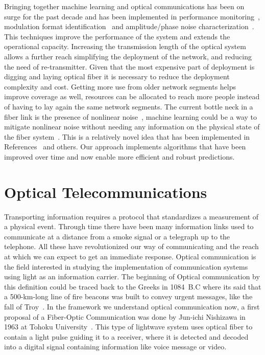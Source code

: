 Bringing together machine learning and optical communications has been on surge for the past decade and has been implemented in performance monitoring~\cite{shen2010optical,jargon2008optical}, modulation format identification~\cite{khan2012modulation} and amplitude/phase noise characterization~\cite{zibar2015application}. This techniques improve the performance of the system and extends the operational capacity. Increasing the transmission length of the optical system allows a further reach simplifying the deployment of the network, and reducing the need of re-transmitter. Given that the most expensive part of deployment is digging and laying optical fiber it is necessary to reduce the deployment complexity and cost. Getting more use from older network segments helps improve coverage as well, resources can be allocated to reach more people instead of having to lay again the same network segments. The current bottle neck in a fiber link is the presence of nonlinear noise~\cite{NLPNDSP}, machine learning could be a way to mitigate nonlinear noise without needing any information on the physical state of the fiber system~\cite{Nonparameter}. This is a relatively novel idea that has been implemented in References~\cite{Nonparameter,zibar2015application} and others. Our approach implements algorithms that have been improved over time and now enable more efficient and robust predictions.  






 



\section{Optical Telecommunications}

Transporting information requires a protocol that standardizes a measurement of a physical event. Through time there have been many information links used to communicate at a distance from a smoke signal or a telegraph up to the telephone. All these have revolutionized our way of communicating and the reach at which we can expect to get an immediate response. Optical communication is the field interested in studying the implementation of communication systems using light as an information carrier. The beginning of Optical communication by this definition could be traced back to the Greeks in 1084~B.C where its said that a 500-km-long line of fire beacons was built to convey urgent messages, like the fall of Troy~\cite{HistoryCommunication}. In the framework we understand optical communication now, a first proposal of a Fiber-Optic Communication was done by Jun-ichi Nishizawa in 1963 at Tohoku University~\cite{ProposeFiberCom}. This type of lightwave system uses optical fiber to contain a light pulse guiding it to a receiver, where it is detected  and decoded into a digital signal containing information like voice message or video.

